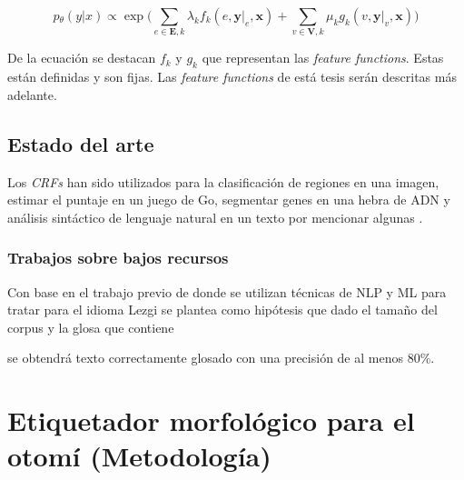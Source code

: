 \documentclass[letterpaper,12pt,oneside]{scrbook}
\theoremstyle{definition}
\begin{document}
	\begin{equation}

	p{_{\theta}}(y|x) \propto \exp \bigg( \sum\limits_{e \in \mathbf{E},k} \lambda_{k}f_{k}(e,\mathbf{y}|_{e},\mathbf{x}) + \sum\limits_{v \in \mathbf{V},k}\mu_{k}g_{k}(v,\mathbf{y}|_{v},\mathbf{x}) \bigg)

	\end{equation}

	


	
	De la ecuación  se destacan $f_{k}$ y $g_{k}$ que representan las \textit{feature functions}. Estas están definidas y son fijas. Las \textit{feature functions} de está tesis serán descritas más adelante. 

	
	\section{Estado del arte}

	
	Los \textit{CRFs} han sido utilizados para la clasificación de regiones en una imagen, estimar el puntaje en un juego de Go, segmentar genes en una hebra de ADN y análisis sintáctico de lenguaje natural en un texto por mencionar algunas \citep{sutton2012introduction}.

	
	
	\subsection{Trabajos sobre bajos recursos}


	Con base en el trabajo previo de \citep{moeller2018automatic} donde se utilizan técnicas de NLP y ML para tratar para el idioma Lezgi se plantea como hipótesis que dado el tamaño del corpus y la glosa que contiene 

	se obtendrá texto correctamente glosado con una precisión de al menos 80\%.

	

	


	
	
	\chapter{Etiquetador morfológico para el otomí (Metodología)}
\end{document}
